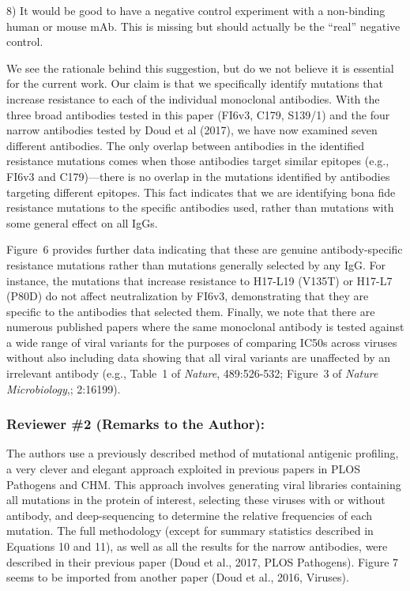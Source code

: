 \documentclass[11pt, oneside]{article}   	%
\begin{document}
8) It would be good to have a negative control experiment with a non-binding human or mouse mAb. This is missing but should actually be the ``real'' negative control.

{\color{black}
We see the rationale behind this suggestion, but do we not believe it is essential for the current work. 
Our claim is that we specifically identify mutations that increase resistance to each of the individual monoclonal antibodies.
With the three broad antibodies tested in this paper (FI6v3, C179, S139/1) and the four narrow antibodies tested by Doud et al (2017), we have now examined seven different antibodies.
The only overlap between antibodies in the identified resistance mutations comes when those antibodies target similar epitopes (e.g., FI6v3 and C179)---there is no overlap in the mutations identified by antibodies targeting different epitopes.
This fact indicates that we are identifying bona fide resistance mutations to the specific antibodies used, rather than mutations with some general effect on all IgGs.

Figure~6 provides further data indicating that these are genuine antibody-specific resistance mutations rather than mutations generally selected by any IgG.
For instance, the mutations that increase resistance to H17-L19 (V135T) or H17-L7 (P80D) do not affect neutralization by FI6v3, demonstrating that they are specific to the antibodies that selected them.
Finally, we note that there are numerous published papers where the same monoclonal antibody is tested against a wide range of viral variants for the purposes of comparing IC50s across viruses without also including data showing that all viral variants are unaffected by an irrelevant antibody (e.g., Table~1 of \textit{Nature}, 489:526-532; Figure~3 of \textit{Nature Microbiology},; 2:16199).
}

\subsubsection*{Reviewer \#2 (Remarks to the Author):}

The authors use a previously described method of mutational antigenic profiling, a very clever and elegant approach exploited in previous papers in PLOS Pathogens and CHM. This approach involves generating viral libraries containing all mutations in the protein of interest, selecting these viruses with or without antibody, and deep-sequencing to determine the relative frequencies of each mutation. The full methodology (except for summary statistics described in Equations 10 and 11), as well as all the results for the narrow antibodies, were described in their previous paper (Doud et al., 2017, PLOS Pathogens). Figure 7 seems to be imported from another paper (Doud et al., 2016, Viruses).
\end{document}
